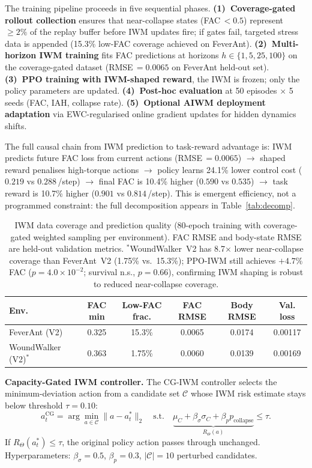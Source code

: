 \documentclass{article}
\begin{document}
{The training pipeline proceeds in five sequential phases.
\textbf{(1)~Coverage-gated rollout collection} ensures that near-collapse states (FAC\,$<\!0.5$) represent $\geq\!2\%$ of the replay buffer before IWM updates fire; if gates fail, targeted stress data is appended (15.3\% low-FAC coverage achieved on FeverAnt).
\textbf{(2)~Multi-horizon IWM training} fits FAC predictions at horizons $h \in \{1,5,25,100\}$ on the coverage-gated dataset (RMSE\,$=\!0.0065$ on FeverAnt held-out set).
\textbf{(3)~PPO training with IWM-shaped reward}, the IWM is frozen; only the policy parameters are updated.
\textbf{(4)~Post-hoc evaluation} at 50 episodes $\times$ 5 seeds (FAC, IAH, collapse rate).
\textbf{(5)~Optional AIWM deployment adaptation} via EWC-regularised online gradient updates for hidden dynamics shifts.

The full causal chain from IWM prediction to task-reward advantage is: IWM predicts future FAC loss from current actions (RMSE\,$=\!0.0065$) $\rightarrow$ shaped reward penalises high-torque actions $\rightarrow$ policy learns 24.1\% lower control cost ($0.219$ vs $0.288$\,/step) $\rightarrow$ final FAC is 10.4\% higher ($0.590$ vs $0.535$) $\rightarrow$ task reward is 10.7\% higher ($0.901$ vs $0.814$\,/step). This is emergent efficiency, not a programmed constraint: the full decomposition appears in Table~\ref{tab:decomp}.

\begin{table}[H]
\centering
\caption{IWM data coverage and prediction quality (80-epoch training with
coverage-gated weighted sampling per environment).  FAC RMSE and body-state RMSE
are held-out validation metrics.
$^*$WoundWalker~V2 has 8.7$\times$ lower near-collapse coverage than FeverAnt~V2
(1.75\% vs.\ 15.3\%); PPO-IWM still achieves $+4.7\%$ FAC ($p\!=\!4.0{\times}10^{-2}$; survival n.s., $p\!=\!0.66$),
confirming IWM shaping is robust to reduced near-collapse coverage.}
\label{tab:iwm}
\begin{tabular}{lccccc}
\toprule
Env. & FAC min & Low-FAC frac. & FAC RMSE & Body RMSE & Val. loss \\
\midrule
FeverAnt (V2) & 0.325 & 15.3\% & 0.0065 & 0.0174 & 0.00117 \\
WoundWalker (V2)$^*$ & 0.363 & 1.75\% & 0.0060 & 0.0139 & 0.00169 \\
\bottomrule
\end{tabular}
\end{table}

\textbf{Capacity-Gated IWM controller.}
The CG-IWM controller selects the minimum-deviation action from a candidate set $\mathcal{C}$ whose IWM risk estimate stays below threshold $\tau\!=\!0.10$:
\begin{equation}
    a_t^{\mathrm{CG}} =
    \arg\min_{a \in \mathcal{C}} \|a - a_t^*\|_2
    \quad \text{s.t.}\quad
    \underbrace{\mu_C + \beta_\sigma \sigma_C + \beta_p p_{\mathrm{collapse}}}_{R_\Theta(a)} \le \tau .
    \label{eq:cgiwm}
\end{equation}
If $R_\Theta(a_t^*) \le \tau$, the original policy action passes through unchanged. Hyperparameters: $\beta_\sigma\!=\!0.5$, $\beta_p\!=\!0.3$, $|\mathcal{C}|\!=\!10$ perturbed candidates.


}
\end{document}
